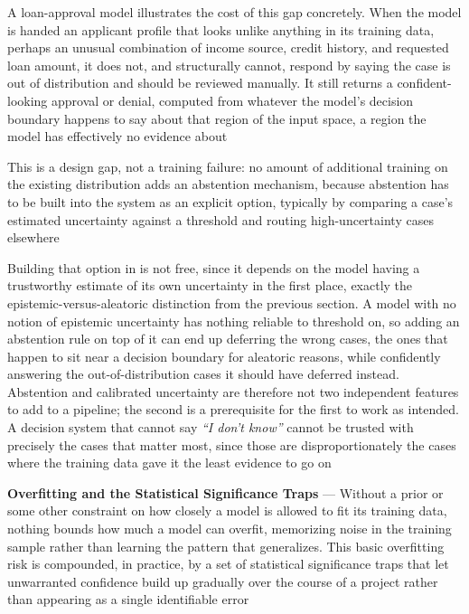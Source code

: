 A loan-approval model illustrates the cost of this gap concretely. When the
model is handed an applicant profile that looks unlike anything in its training
data, perhaps an unusual combination of income source, credit history, and requested
loan amount, it does not, and structurally cannot, respond by saying the case is
out of distribution and should be reviewed manually. It still returns a confident-looking
approval or denial, computed from whatever the model's decision boundary happens
to say about that region of the input space, a region the model has effectively no
evidence about

This is a design gap, not a training failure: no amount of additional training
on the existing distribution adds an abstention mechanism, because abstention has
to be built into the system as an explicit option, typically by comparing a case's
estimated uncertainty against a threshold and routing high-uncertainty cases
elsewhere

Building that option in is not free, since it depends on the model having a
trustworthy estimate of its own uncertainty in the first place, exactly the epistemic-versus-aleatoric
distinction from the previous section. A model with no notion of epistemic
uncertainty has nothing reliable to threshold on, so adding an abstention rule on
top of it can end up deferring the wrong cases, the ones that happen to sit near
a decision boundary for aleatoric reasons, while confidently answering the out-of-distribution
cases it should have deferred instead. Abstention and calibrated uncertainty are
therefore not two independent features to add to a pipeline; the second is a prerequisite
for the first to work as intended. A decision system that cannot say \emph{``I
don't know''} cannot be trusted with precisely the cases that matter most, since
those are disproportionately the cases where the training data gave it the least
evidence to go on

\textbf{Overfitting and the Statistical Significance Traps} --- Without a prior
or some other constraint on how closely a model is allowed to fit its training
data, nothing bounds how much a model can overfit, memorizing noise in the
training sample rather than learning the pattern that generalizes. This basic overfitting
risk is compounded, in practice, by a set of statistical significance traps that
let unwarranted confidence build up gradually over the course of a project rather
than appearing as a single identifiable error

